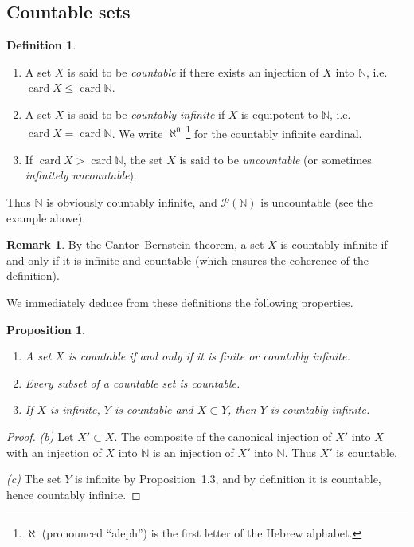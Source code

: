 \documentclass[12pt]{article}
\newtheorem{proposition}{Proposition}[section]
\theoremstyle{definition}
\newtheorem{definition}{Definition}[section]
\newtheorem{remark}{Remark}[section]
\begin{document}
\subsection{Countable sets}

\begin{definition}
\begin{enumerate}[label=(\alph*),leftmargin=2em]
\item A set $X$ is said to be \emph{countable} if there exists an injection of $X$ into $\mathbb N$, i.e.\ $\operatorname{card} X\le \operatorname{card}\mathbb N$.
\item A set $X$ is said to be \emph{countably infinite} if $X$ is equipotent to $\mathbb N$, i.e.\ $\operatorname{card} X=\operatorname{card}\mathbb N$.
We write $\aleph^0$\,\footnote{$\aleph$ (pronounced ``aleph'') is the first letter of the Hebrew alphabet.} for the countably infinite cardinal.
\item If $\operatorname{card} X > \operatorname{card}\mathbb N$, the set $X$ is said to be \emph{uncountable} (or sometimes \emph{infinitely uncountable}).
\end{enumerate}
\end{definition}

Thus $\mathbb N$ is obviously countably infinite, and $\mathcal P(\mathbb N)$ is uncountable (see the example above).

\begin{remark}
By the Cantor--Bernstein theorem, a set $X$ is countably infinite if and only if it is infinite and countable (which ensures the coherence of the definition).
\end{remark}

We immediately deduce from these definitions the following properties.

\begin{proposition}
\begin{enumerate}[label=(\alph*),leftmargin=2em]
\item A set $X$ is countable if and only if it is finite or countably infinite.
\item Every subset of a countable set is countable.
\item If $X$ is infinite, $Y$ is countable and $X\subset Y$, then $Y$ is countably infinite.
\end{enumerate}
\end{proposition}

\begin{proof}
\emph{(b)} Let $X'\subset X$.
The composite of the canonical injection of $X'$ into $X$ with an injection of $X$ into $\mathbb N$ is an injection of $X'$ into $\mathbb N$.
Thus $X'$ is countable.

\emph{(c)} The set $Y$ is infinite by Proposition~1.3, and by definition it is countable, hence countably infinite.
\end{proof}
\end{document}
